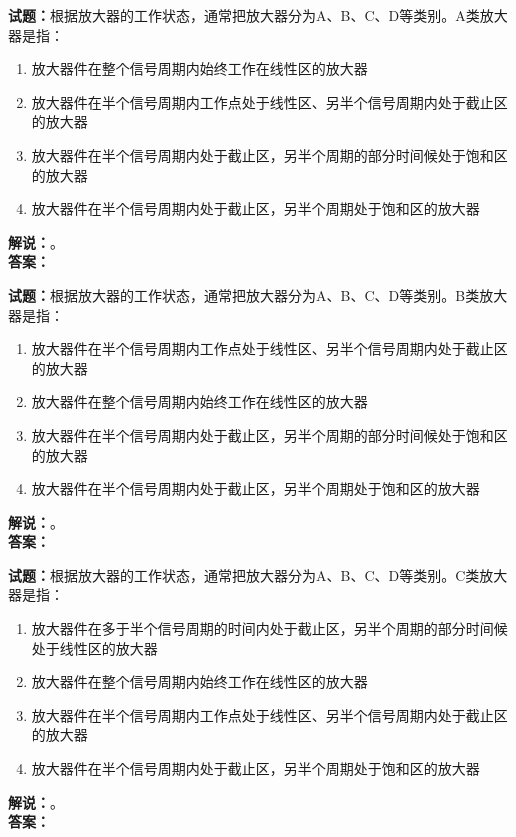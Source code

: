 \documentclass{ctexbook}
\begin{document}
\vspace{\baselineskip}

\noindent\textbf{试题：}根据放大器的工作状态，通常把放大器分为A、B、C、D等类别。A类放大器是指：
\begin{enumerate}[leftmargin=3em]
  \item 放大器件在整个信号周期内始终工作在线性区的放大器
  \item 放大器件在半个信号周期内工作点处于线性区、另半个信号周期内处于截止区的放大器
  \item 放大器件在半个信号周期内处于截止区，另半个周期的部分时间候处于饱和区的放大器
  \item 放大器件在半个信号周期内处于截止区，另半个周期处于饱和区的放大器
\end{enumerate}
\noindent\textbf{解说：}\textbf{}。\\\noindent\textbf{答案：}

\vspace{\baselineskip}

\noindent\textbf{试题：}根据放大器的工作状态，通常把放大器分为A、B、C、D等类别。B类放大器是指：
\begin{enumerate}[leftmargin=3em]
  \item 放大器件在半个信号周期内工作点处于线性区、另半个信号周期内处于截止区的放大器
  \item 放大器件在整个信号周期内始终工作在线性区的放大器
  \item 放大器件在半个信号周期内处于截止区，另半个周期的部分时间候处于饱和区的放大器
  \item 放大器件在半个信号周期内处于截止区，另半个周期处于饱和区的放大器
\end{enumerate}
\noindent\textbf{解说：}\textbf{}。\\\noindent\textbf{答案：}

\vspace{\baselineskip}

\noindent\textbf{试题：}根据放大器的工作状态，通常把放大器分为A、B、C、D等类别。C类放大器是指：
\begin{enumerate}[leftmargin=3em]
  \item 放大器件在多于半个信号周期的时间内处于截止区，另半个周期的部分时间候处于线性区的放大器
  \item 放大器件在整个信号周期内始终工作在线性区的放大器
  \item 放大器件在半个信号周期内工作点处于线性区、另半个信号周期内处于截止区的放大器
  \item 放大器件在半个信号周期内处于截止区，另半个周期处于饱和区的放大器
\end{enumerate}
\noindent\textbf{解说：}\textbf{}。\\\noindent\textbf{答案：}
\end{document}
